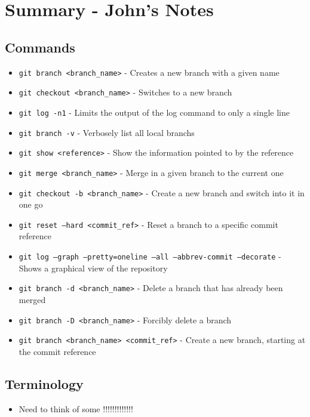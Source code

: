 \clearpage

\section{Summary - John's Notes}
\subsection{Commands}
\begin{itemize}
\item\texttt{git branch <branch\_name>} - Creates a new branch with a given name

\item\texttt{git checkout <branch\_name>} - Switches to a new branch

\item\texttt{git log -n1} - Limits the output of the log command to only a single line

\item\texttt{git branch -v} - Verbosely list all local branchs

\item\texttt{git show <reference>} - Show the information pointed to by the reference

\item\texttt{git merge <branch\_name>} - Merge in a given branch to the current one

\item\texttt{git checkout -b <branch\_name>} - Create a new branch and switch into it in one go

\item\texttt{git reset --hard <commit\_ref>} - Reset a branch to a specific commit reference

\item\texttt{git log --graph --pretty=oneline --all --abbrev-commit --decorate} - Shows a graphical view of the repository

\item\texttt{git branch -d <branch\_name>} - Delete a branch that has already been merged

\item\texttt{git branch -D <branch\_name>} - Forcibly delete a branch

\item\texttt{git branch <branch\_name> <commit\_ref>} - Create a new branch, starting at the commit reference

\end{itemize}

\subsection{Terminology}
\begin{itemize}
\item Need to think of some !!!!!!!!!!!!!
\end{itemize}
